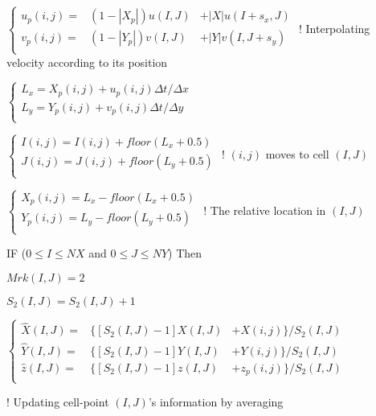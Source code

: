 \documentclass[review]{elsarticle}
\theoremstyle{plain}\newtheorem{definition}{\sc{Definition}}
\theoremstyle{defination}\newtheorem{example}{Example}[section]
\numberwithin{equation}{section}
\numberwithin{table}{section}
\begin{document}
{{{{ \hspace{1.5cm}	$\left\{
  \begin{array}{lll}
u_p(i,j)=&(1-|X_p|)u(I,J)&+|X|u(I+s_x,J)\\
v_p(i,j)=&(1-|Y_p|)v(I,J)&+|Y|v(I,J+s_y)\\
	\end{array}
	\right.$
 \hspace{0.5cm}
  \color{black!60} ! Interpolating velocity according to its position \color{black!80}


 \hspace{1.5cm}	$\left\{
  \begin{array}{l}
	L_x=X_p(i,j)+u_p(i,j)\Delta t/ \Delta x\\
    L_y=Y_p(i,j)+v_p(i,j)\Delta t/ \Delta y\\
	\end{array}
	\right.$

 \hspace{1.5cm}	$\left\{
  \begin{array}{l}
	I(i,j)=I(i,j)+floor(L_x+0.5)\\
    J(i,j)=J(i,j)+floor(L_y+0.5)\\
	\end{array}
	\right.$
  { \color{black!60} \hspace{2.3cm}
! $(i,j)$ moves to cell $(I,J)$} {\color{black!80}

 \hspace{1.5cm}	$\left\{
  \begin{array}{l}
	X_p(i,j)=L_x-floor(L_x+0.5)\\
    Y_p(i,j)=L_y-floor(L_y+0.5)\\
	\end{array}
	\right.$
	{ \color{black!60} \hspace{2.5cm}
! The relative location in $(I,J)$} {\color{black!80}

\vspace{0.1cm}
\hspace{1.5cm} \color{black!60!blue!80} IF
\color{black!70} ($0 \leqslant I \leqslant NX$ and $0 \leqslant J \leqslant NY$)
\color{black!60!blue!80} Then
\color{black!80}

\hspace{2.0cm} $Mrk(I,J)=2$

\hspace{2.0cm} $S_2(I,J)=S_2(I,J)+1$

\hspace{2.0cm}	$\left\{
  \begin{array}{rlr}
	\hat{X}(I,J)=&\{[S_2(I,J)-1]X(I,J)&+X(i,j)\}/S_2(I,J)\\  
	\hat{Y}(I,J)=&\{[S_2(I,J)-1]Y(I,J)&+Y(i,j)\}/S_2(I,J)\\
	\hat{z}(I,J)=&\{[S_2(I,J)-1]z(I,J)&+z_p(i,j)\}/S_2(I,J)\\
	\end{array}
	\right.$
  }
  \hspace{0cm}
  \begin{minipage}{7cm}
	\color{black!60}
! Updating cell-point $(I,J)$'s 
 information by averaging 


\end{minipage}}}}}}
\end{document}
